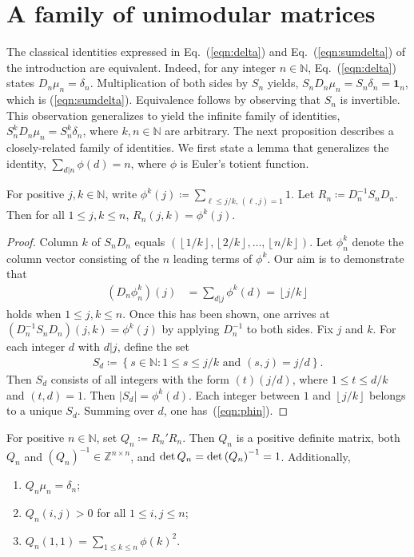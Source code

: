 \documentclass[12pt,reqno]{article}
\newcommand{\abs}[1]{\ensuremath{\left|{#1}\right|}}
\newcommand\floor[1]{\left\lfloor#1\right\rfloor}
\newcommand{\paren}[1]{\left\lparen{#1}\right\rparen}
\newcommand{\N}{\ensuremath{\mathbb{N}}}
\newcommand{\Z}{\ensuremath{\mathbb{Z}}}
\newcommand{\vv}[1]{\ensuremath{\mathbf{#1}}}
\newcommand{\set}[1]{\ensuremath{\left\{{#1}\right\}}}
\begin{document}
\section{A family of unimodular matrices}
\label{sec:qn}
The classical identities expressed in Eq.~(\ref{eqn:delta}) and Eq.~(\ref{eqn:sumdelta}) of the introduction are equivalent.
Indeed, for any integer $n\in\N$, 
Eq.~(\ref{eqn:delta}) states $D_n\mu_n=\delta_n$. 
Multiplication of both sides by $S_n$ yields, $S_nD_n\mu_n=S_n\delta_n = \vv{1}_n$, which is (\ref{eqn:sumdelta}). 
Equivalence follows by observing that $S_n$ is invertible. This observation generalizes to 
yield the infinite family of identities, $S_n^{k}D^{\phantom{k}}_n\mu_n = S_n^{k}\delta^{\phantom{k}}_n$, where
$k,n\in\N$ are arbitrary.  The next proposition describes a closely-related family of identities.
We first state a lemma that generalizes the identity, $\sum_{d|n}\phi(d)=n$, where $\phi$ is Euler's totient function.
\begin{lemma}
For positive $j,k\in\N$, write $\phi^{k}(j)\coloneqq \sum_{\ell\leq j/k,\, (\ell,j)=1} 1$. 
Let $R_{n}\coloneqq D_n^{-1}S_nD_n$. Then for all $1\leq j,k\leq n$, $R_{n}(j,k) = \phi^{k}(j)$. 
\label{lem:phi}
\end{lemma}
\begin{proof}
Column $k$ of $S_nD_n$ equals $(\floor{1/k},\floor{2/k},\ldots,\floor{n/k})$. Let $\phi^{k}_{n}$ denote the column vector consisting of the 
$n$ leading terms of $\phi^{k}$.  Our aim is to demonstrate that
\begin{align}
(D_n\phi^{k}_{n})(j) &= \sum_{d|j}\phi^{k}(d)=\floor{j/k}
\label{eqn:phin}
\end{align}
holds when $1\leq j,k \leq n$. Once this has been shown, one arrives at $( D_n^{-1}S_nD_n)(j,k)=\phi^{k}(j)$ by applying $D_n^{-1}$ to both sides.
Fix $j$ and $k$. For each integer $d$ with $d|j$, define the set
\begin{align*}
S_d\coloneqq\set{s\in\N: 1\leq s\leq j/k\text{ and } (s,j)=j/d}.
\end{align*}
Then $S_d$ consists of all integers with the form $(t)(j/d)$, where $1\leq t\leq d/k$ and $(t,d)=1$.
Then $\abs{S_d} = \phi^k(d)$. Each integer between $1$ and $\floor{j/k}$ belongs to a unique $S_d$. Summing over $d$, one has~(\ref{eqn:phin}).
\end{proof}
\begin{proposition}
For positive $n\in\N$, set $Q_n\coloneqq R_n'R_n$.
Then $Q_n$ is a positive definite matrix, both $Q_n$ and $(Q_n)^{-1}\in\Z^{n\times n}$, and $\det Q_{n} = \det\paren{Q_{n}}^{-1}=1$. 
Additionally,
\begin{enumerate}
\item $Q_n\mu_n=\delta_n$\label{item:delta}; 
\item $Q_{n}(i,j)>0$ for all $1\leq i,j\leq n$;\label{item:pos}
\item $Q_{n}(1,1) = \sum_{1\leq k\leq n} \phi(k)^2$\label{item:lambdan}. 
\end{enumerate}
\label{prp:qn}
\end{proposition}
\end{document}
